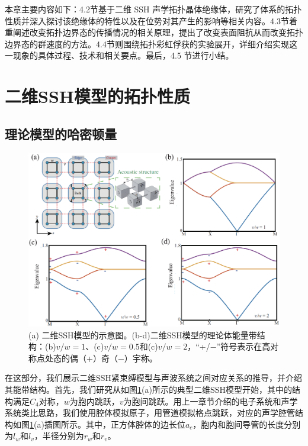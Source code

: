 本章主要内容如下：4.2节基于二维 SSH 声学拓扑晶体绝缘体，研究了体系的拓扑性质并深入探讨该绝缘体的特性以及在位势对其产生的影响等相关内容。4.3节着重阐述改变拓扑边界态的传播情况的相关原理，提出了改变表面阻抗从而改变拓扑边界态的群速度的方法。4.4节则围绕拓扑彩虹俘获的实验展开，详细介绍实现这一现象的具体过程、技术和相关要点。最后，4.5 节进行小结。

\section{二维SSH模型的拓扑性质}

\subsection{理论模型的哈密顿量}
\begin{figure}[h!]
    \centering
    \includegraphics[width=1\textwidth]{images/fig4-1.eps} 
    \caption{(a) 二维SSH模型的示意图。(b-d)二维SSH模型的理论体能量带结构：(b)$v/w = 1$、(c)$v/w = 0.5$和(c)$v/w = 2$，“+/−”符号表示在高对称点处态的偶（+）奇（−）宇称。}
    \label{fig_4_1}
  \end{figure}  

在这部分，我们展示二维SSH紧束缚模型与声波系统之间对应关系的推导，并介绍其能带结构。首先，我们研究从如图\ref{fig_4_1}(a)所示的典型二维SSH模型开始，其中的结构满足$C_4$对称，$w$为胞内跳跃，$v$为胞间跳跃。用上一章节介绍的电子系统和声学系统类比思路，我们使用腔体模拟原子，用管道模拟格点跳跃，对应的声学腔管结构如图\ref{fig_4_1}(a)插图所示。其中，正方体腔体的边长位$a_c$，胞内和胞间导管的长度分别为$l_w$和$l_v$，半径分别为$r_w$和$r_v$。

